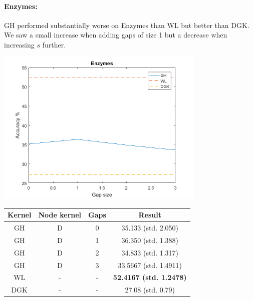 \documentclass{article}
\begin{document}
\paragraph{Enzymes:}
GH performed substantially worse on Enzymes than WL but better than DGK. We saw a small increase when adding gaps of size 1 but a decrease when increasing $s$ further.\\
\begin{minipage}{0.6\linewidth}
	\hspace*{-1in}
	\includegraphics[width=10cm]{enzymes}
	\label{fig:enzymes}
\end{minipage}
\begin{minipage}[c]{0.5\linewidth}
	
	\centering
	\begin{tabular}{c|c|c|c}
		Kernel & Node kernel & Gaps & Result\\
		\hline
		GH & D & 0 & 35.133 (std. 2.050)\\
		GH & D & 1 & 36.350 (std. 1.388)\\
		GH & D & 2 & 34.833 (std. 1.317)\\
		GH & D & 3 & 33.5667 (std. 1.4911)\\
		WL & - & - & \textbf{52.4167 (std. 1.2478)}\\
		DGK\cite{yanardag} & - & - & 27.08 (std. 0.79)
	\end{tabular}
	\label{table:enzymes}
\end{minipage}
\end{document}
